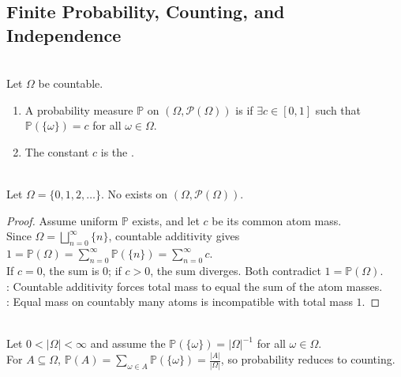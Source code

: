 \subsection{Finite Probability, Counting, and Independence}
\begin{definition} \label{def:uniform-probability-countable-space} \\
Let $\Omega$ be countable.
\begin{enumerate}[label=(\roman*)]
\setlength{\itemsep}{0pt}
\item A probability measure $\mathbb{P}$ on $(\Omega,\mathcal{P}(\Omega))$ is  if $\exists c\in[0,1]$ such that $\mathbb{P}(\{\omega\})=c$ for all $\omega\in\Omega$.
\item The constant $c$ is the .
\end{enumerate}
\end{definition}

\begin{proposition} \label{prop:no-uniform-probability-on-countably-infinite-set} \\
Let $\Omega=\{0,1,2,\ldots\}$. No  exists on $(\Omega,\mathcal{P}(\Omega))$.
\begin{proof}
Assume uniform $\mathbb{P}$ exists, and let $c$ be its common atom mass.\\
Since $\Omega=\bigsqcup\limits_{n=0}^{\infty}\{n\}$, countable additivity gives $1=\mathbb{P}(\Omega)=\sum\limits_{n=0}^{\infty}\mathbb{P}(\{n\})=\sum\limits_{n=0}^{\infty}c$.\\
If $c=0$, the sum is $0$; if $c>0$, the sum diverges. Both contradict $1=\mathbb{P}(\Omega)$.\\
: Countable additivity forces total mass to equal the sum of the atom masses.\\
: Equal mass on countably many atoms is incompatible with total mass $1$.
\end{proof}
\end{proposition}

\begin{method} \label{meth:finite-uniform-probability-by-counting} \\
Let $0<|\Omega|<\infty$ and assume the  $\mathbb{P}(\{\omega\})=|\Omega|^{-1}$ for all $\omega\in\Omega$.\\
For $A\subseteq\Omega$, $\mathbb{P}(A)=\sum\limits_{\omega\in A}\mathbb{P}(\{\omega\})=\frac{|A|}{|\Omega|}$, so probability reduces to counting.
\end{method}

